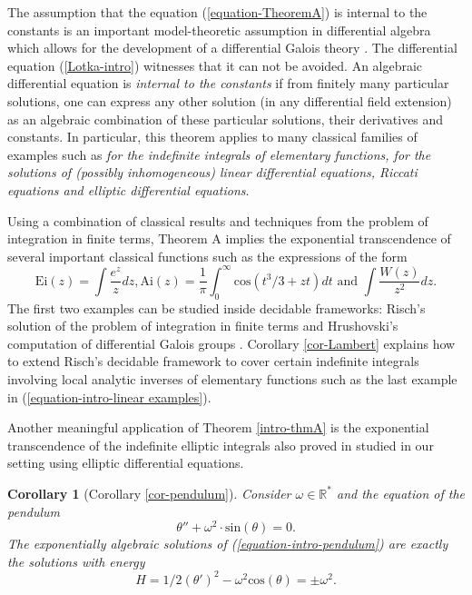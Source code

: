 \documentclass[12pt]{amsart}
\theoremstyle{definition}
\theoremstyle{plain}
\theoremstyle{exampstyle}\newtheorem{thmx}{Theorem}
\theoremstyle{exampstyle}\newtheorem{thmxbis}{Theorem}
\newtheorem*{corx}{Corollary}
\begin{document}
The assumption that the equation (\ref{equation-TheoremA}) is internal to the constants is an important model-theoretic assumption in differential algebra which allows for the development of a differential Galois theory \cite{Hrushovski-Galois,Pillay-Galois, Pillay-Leon-Sanchez}. The differential equation (\ref{Lotka-intro}) witnesses that it can not be avoided. An algebraic differential equation is {\em internal to the constants} if from finitely many particular solutions, one can express any other solution (in any differential field extension) as an algebraic combination of these particular solutions, their derivatives and constants. In particular, this theorem applies to many classical families of examples such as  {\em for the indefinite integrals of elementary functions, for the solutions of (possibly inhomogeneous) linear differential equations, Riccati equations and elliptic differential equations}.  

Using a combination of classical results and techniques from the problem of integration in finite terms, Theorem A implies the exponential transcendence of several important classical functions such as the expressions of the form
\begin{equation}\label{equation-intro-linear examples}
 \mathrm{Ei}(z) = \int \frac {e^z} {z} dz,  \mathrm{Ai}(z) = \frac 1 \pi \int_0^\infty \mathrm{cos}(t^3/3 + zt) dt \text{ and } \int\frac{W(z)}{z^2} dz.
 \end{equation}
The first two examples can be studied inside decidable frameworks: Risch's solution of the problem of integration in finite terms \cite{Singer-Raab} and Hrushovski's computation of differential Galois groups \cite{Hrushovski-Galois}. Corollary \ref{cor-Lambert} explains how to extend Risch's decidable framework to cover certain indefinite integrals involving local analytic inverses of elementary functions such as the last example in (\ref{equation-intro-linear examples}).


Another meaningful application of Theorem \ref{intro-thmA} is the exponential transcendence of the indefinite elliptic integrals also proved in \cite{Jones-Kirby-Servi} studied in our setting using  elliptic differential equations. 

\begin{corx}[Corollary \ref{cor-pendulum}]
Consider $\omega \in \mathbb{R}^\ast$ and the equation of the pendulum 
\begin{equation}\label{equation-intro-pendulum}
\theta'' + \omega^2 \cdot \mathrm{sin}(\theta) = 0.
\end{equation}
The exponentially algebraic solutions of (\ref{equation-intro-pendulum}) are exactly the solutions with energy $$H = 1/2 (\theta')^2 - \omega^2 \mathrm{cos}(\theta) = \pm \omega^2.$$
\end{corx}
\end{document}
